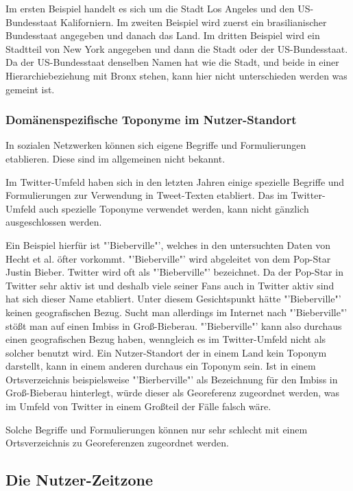 				Im ersten Beispiel handelt es sich um die Stadt Los Angeles und den US-Bundesstaat Kaliforniern.
				Im zweiten Beispiel wird zuerst ein brasilianischer Bundesstaat angegeben und danach das Land.
				Im dritten Beispiel wird ein Stadtteil von New York angegeben und dann die Stadt oder der US-Bundesstaat. 
				Da der US-Bundesstaat denselben Namen hat wie die Stadt, und beide in einer Hierarchiebeziehung mit Bronx stehen, kann hier nicht unterschieden werden was gemeint ist.
				
			\subsubsection{Domänenspezifische Toponyme im Nutzer-Standort} 

				In sozialen Netzwerken können sich eigene Begriffe und Formulierungen etablieren. 
				Diese sind im allgemeinen nicht bekannt.

				Im Twitter-Umfeld haben sich in den letzten Jahren einige spezielle Begriffe und Formulierungen zur Verwendung in Tweet-Texten etabliert. 
				Das im Twitter-Umfeld auch spezielle Toponyme verwendet werden, kann nicht gänzlich ausgeschlossen werden. 

				Ein Beispiel hierfür ist "'Bieberville"', welches in den untersuchten Daten von Hecht et al. öfter vorkommt.
				"'Bieberville"' wird abgeleitet von dem Pop-Star Justin Bieber.	
				Twitter wird oft als "'Bieberville"' bezeichnet.
				Da der Pop-Star in Twitter sehr aktiv ist und deshalb viele seiner Fans auch in Twitter aktiv sind hat sich dieser Name etabliert.
				Unter diesem Gesichtspunkt hätte "'Bieberville"' keinen geografischen Bezug.
				Sucht man allerdings im Internet nach "'Bieberville"' stößt man auf einen Imbiss in Groß-Bieberau.
				"'Bieberville"' kann also durchaus einen geografischen Bezug haben, wenngleich es im Twitter-Umfeld nicht als solcher benutzt wird. 
				Ein Nutzer-Standort der in einem Land kein Toponym darstellt, kann in einem anderen durchaus ein Toponym sein.
				Ist in einem Ortsverzeichnis beispielsweise "'Bierberville"' als Bezeichnung für den Imbiss in Groß-Bieberau hinterlegt, würde dieser als Georeferenz zugeordnet werden, was im Umfeld von Twitter in einem Großteil der Fälle falsch wäre.

				Solche Begriffe und Formulierungen können nur sehr schlecht mit einem Ortsverzeichnis zu Georeferenzen zugeordnet werden. 

		\subsection{Die Nutzer-Zeitzone}

